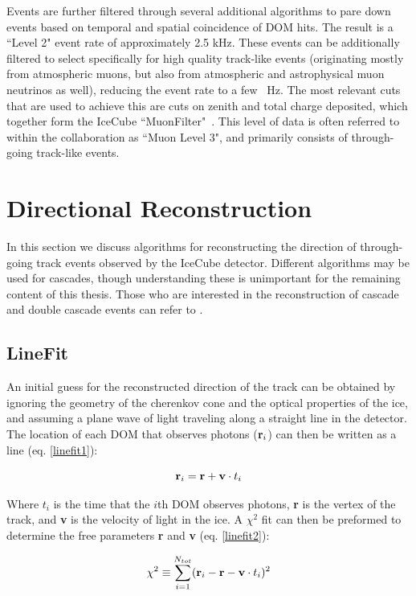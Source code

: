 Events are further filtered through several additional algorithms to pare down events based on temporal and spatial coincidence of DOM hits. The result is a ``Level 2" event rate of approximately 2.5 kHz. These events can be additionally filtered to select specifically for high quality track-like events (originating mostly from atmospheric muons, but also from atmospheric and astrophysical muon neutrinos as well), reducing the event rate to a few ~Hz. The most relevant cuts that are used to achieve this are cuts on zenith and total charge deposited, which together form the IceCube ``MuonFilter"~\cite{muonfilter_ref}.  This level of data is often referred to within the collaboration as ``Muon Level 3", and primarily consists of through-going track-like events. 

\section{Directional Reconstruction}
In this section we discuss algorithms for reconstructing the direction of through-going track events observed by the IceCube detector. Different algorithms may be used for cascades, though understanding these is unimportant for the remaining content of this thesis. Those who are interested in the reconstruction of cascade and double cascade events can refer to \cite{AustinThesis}.

\subsection{LineFit}
An initial guess for the reconstructed direction of the track can be obtained by ignoring the geometry of the cherenkov cone and the optical properties of the ice, and assuming a plane wave of light traveling along a straight line in the detector. The location of each DOM that observes photons ($\textbf r_i$) can then be written as a line (eq. \ref{linefit1}):

\begin{equation}
    \textbf r_i = \textbf r + \textbf v \cdot t_i
    \label{linefit1}
\end{equation}

Where $t_i$ is the time that the $i$th DOM observes photons, \textbf{r} is the vertex of the track, and \textbf{v} is the velocity of light in the ice. A $\chi^2$ fit can then be preformed to determine the free parameters \textbf{r} and \textbf{v} (eq. \ref{linefit2}):

\begin{equation}
    \chi^2 \equiv \sum_{i=1}^{N_{tot}}(\textbf r_i - \textbf r - \textbf v \cdot t_i)^2
    \label{linefit2}
\end{equation}

